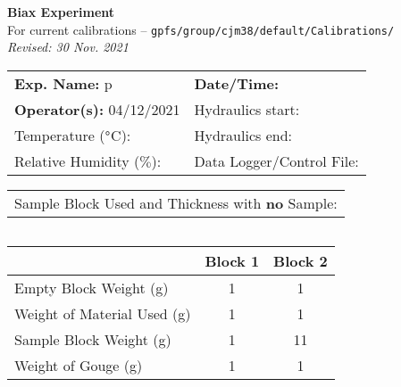 \documentclass[letterpaper, 10pt]{article}
\begin{document}
\begin{center}
    {\Large \textbf{Biax Experiment}}\\
    {\small For current calibrations -- \texttt{gpfs/group/cjm38/default/Calibrations/}}\\
    {\footnotesize \textit{Revised: 30 Nov. 2021}}
\end{center}



\begin{table}[!ht]
	\renewcommand{\arraystretch}{1.1}
	\begin{tabular}{p{10cm} p{10cm} }
	    \textbf{Exp. Name: }p & \textbf{Date/Time: }\\
	    \textbf{Operator(s): }04/12/2021 & Hydraulics start:  \\
	    Temperature ($\degree$C):  & Hydraulics end:  \\
	    Relative Humidity ($\%$):  & Data Logger/Control File:   \\
	\end{tabular}
\end{table} 
\vspace{-0.5cm} 

\begin{table}[!ht]
	\renewcommand{\arraystretch}{1.1}
	\begin{tabular}{p{20cm}}Sample Block Used and Thickness with \textbf{no} Sample:  \\
	\end{tabular}
    \end{table} \vspace{-0.5cm} 

\begin{table}[!ht]
        \small
        \renewcommand{\arraystretch}{1.2}
        \begin{tabular}{ |p{7cm}| } \hline 
 \hline \end{tabular}\hfill
        \begin{tabular}{ |l|c|c| } \hline
            & Block 1 & Block 2 \\ \hline 
Empty Block Weight (g) & 1  & 1\\ \hline
	    Weight of Material Used (g) & 1 & 1 \\ \hline
	    Sample Block Weight (g) & 1 & 11 \\ \hline
	    Weight of Gouge (g) & 1 & 1 \\ \hline\end{tabular}\end{table} \vspace{-0.5cm} 
\end{document}
